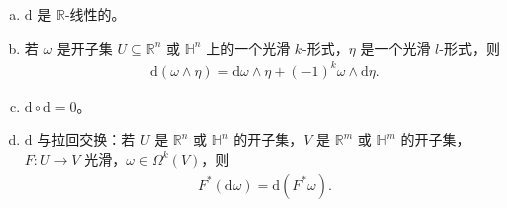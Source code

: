 \documentclass[../../main.tex]{subfiles}
\begin{document}
\begin{proposition}\label{proposition:ch14-exterior-euclidean}
\begin{enumerate}[(a)]
\item $\mathrm{d}$ 是 $\mathbb{R}$-线性的。
\item 若 $\omega$ 是开子集 $U\subseteq\mathbb{R}^n$ 或 $\mathbb{H}^n$ 上的一个光滑 $k$-形式，$\eta$ 是一个光滑 $l$-形式，则
\begin{align*}
\mathrm{d}(\omega\wedge\eta)=\mathrm{d}\omega\wedge\eta+(-1)^k\omega\wedge\mathrm{d}\eta.
\end{align*}
\item $\mathrm{d}\circ\mathrm{d}=0$。
\item $\mathrm{d}$ 与拉回交换：若 $U$ 是 $\mathbb{R}^n$ 或 $\mathbb{H}^n$ 的开子集，$V$ 是 $\mathbb{R}^m$ 或 $\mathbb{H}^m$ 的开子集，$F:U\to V$ 光滑，$\omega\in\Omega^k(V)$，则
\begin{align}
F^*(\mathrm{d}\omega)=\mathrm{d}(F^*\omega).\label{align:ch14-euclidean-naturality}
\end{align}
\end{enumerate}
\end{proposition}
\end{document}
